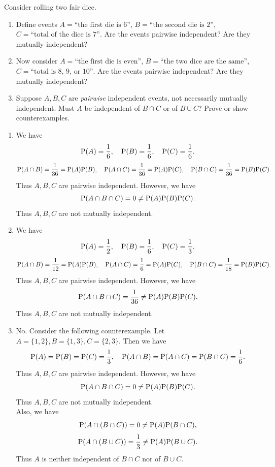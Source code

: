 \documentclass[12pt]{article}
\newcommand{\Prob}{{\rm P}}
\newenvironment{problem}[2][Problem]{\begin{trivlist}
\item[\hskip \labelsep {\bfseries #1}\hskip \labelsep {\bfseries #2.}]}
{\end{trivlist}}
\begin{document}
\begin{problem}{5}
  Consider rolling two fair dice.
  \begin{enumerate}
    \item Define events $A = \text{``the first die is 6''}$,
    $B = \text{``the second die is 2''}$,
    $C = \text{``total of the dice is 7''}$. Are the events
    pairwise independent? Are they mutually independent?
    \item Now consider $A = \text{``the first die is even''}$,
    $B = \text{``the two dice are the same''}$,
    $C = \text{``total is 8, 9, or 10''}$. Are the events
    pairwise independent? Are they mutually independent?
    \item Suppose $A,B,C$ are \textit{pairwise} independent events,
    not necessarily mutually independent. Must $A$ be independent of
    $B \cap C$ or of $B \cup C$? Prove or show counterexamples.
  \end{enumerate}
  \begin{enumerate}
    \item We have
    \[
      \Prob(A) = \frac{1}{6}, \quad \Prob(B) = \frac{1}{6}, \quad
      \Prob(C) = \frac{1}{6}.
    \]
    \[
      \Prob(A \cap B) = \frac{1}{36} = \Prob(A)\Prob(B), \quad
      \Prob(A \cap C) = \frac{1}{36} = \Prob(A)\Prob(C), \quad
      \Prob(B \cap C) = \frac{1}{36} = \Prob(B)\Prob(C).
    \]
    Thus $A,B,C$ are pairwise independent. However, we have
    \[
      \Prob(A \cap B \cap C) = 0 \neq \Prob(A)\Prob(B)\Prob(C).
    \]
    Thus $A,B,C$ are not mutually independent.
    \item We have
    \[
      \Prob(A) = \frac{1}{2}, \quad \Prob(B) = \frac{1}{6}, \quad
      \Prob(C) = \frac{1}{3}.
    \]
    \[
      \Prob(A \cap B) = \frac{1}{12} = \Prob(A)\Prob(B), \quad
      \Prob(A \cap C) = \frac{1}{6} = \Prob(A)\Prob(C), \quad
      \Prob(B \cap C) = \frac{1}{18} = \Prob(B)\Prob(C).
    \]
    Thus $A,B,C$ are pairwise independent. However, we have
    \[
      \Prob(A \cap B \cap C) = \frac{1}{36} \neq \Prob(A)\Prob(B)\Prob(C).
    \]
    Thus $A,B,C$ are not mutually independent.
    \item No. Consider the following counterexample. Let
    $A = \{1,2\}, B = \{1,3\}, C = \{2,3\}$. Then we have
    \[
      \Prob(A) = \Prob(B) = \Prob(C) = \frac{1}{3}, \quad
      \Prob(A \cap B) = \Prob(A \cap C) = \Prob(B \cap C) = \frac{1}{6}.
    \]
    Thus $A,B,C$ are pairwise independent. However, we have
    \[
      \Prob(A \cap B \cap C) = 0 \neq \Prob(A)\Prob(B)\Prob(C).
    \]
    Thus $A,B,C$ are not mutually independent.\\
    Also, we have
    \[
      \Prob(A \cap (B \cap C)) = 0 \neq \Prob(A)\Prob(B \cap C),
    \]
    \[
      \Prob(A \cap (B \cup C)) = \frac{1}{3} \neq \Prob(A)\Prob(B \cup C).
    \]
    Thus $A$ is neither independent of $B \cap C$ nor of $B \cup C$.
  \end{enumerate}
\end{problem}
\end{document}
